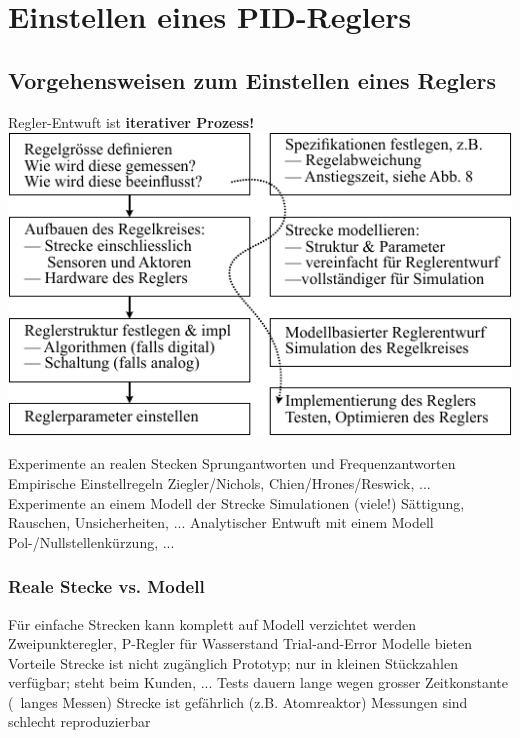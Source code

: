 
\section{Einstellen eines PID-Reglers} 

\subsection{Vorgehensweisen zum Einstellen eines Reglers}

\begin{minipage}[c]{0.43\columnwidth}
    Regler-Entwuft ist \textbf{iterativer Prozess!}
    \includegraphics[width=\columnwidth]{images/reglerentwurf_moegliche_schritte.pdf}
\end{minipage}
\hfill
\begin{minipage}[c]{0.56\columnwidth}
    \begin{outline}
        \1 Experimente an realen Stecken
            \2 Sprungantworten und Frequenzantworten
        \1 Empirische Einstellregeln
            \2 Ziegler/Nichols, Chien/Hrones/Reswick, ...
        \1 Experimente an einem Modell der Strecke
            \2 Simulationen (viele!)
            \2 Sättigung, Rauschen, Unsicherheiten, ...
        \1 Analytischer Entwuft mit einem Modell
            \2 Pol-/Nullstellenkürzung, ...
    \end{outline}
\end{minipage}


\subsubsection{Reale Stecke vs. Modell}

\begin{outline}
    \1 Für einfache Strecken kann komplett auf Modell verzichtet werden
        \2 Zweipunkteregler, P-Regler für Wasserstand
        \2 Trial-and-Error
    \1 Modelle bieten Vorteile
        \2 Strecke ist nicht zugänglich
            \3 Prototyp; nur in kleinen Stückzahlen verfügbar; steht beim Kunden, ...
        \2 Tests dauern lange wegen grosser Zeitkonstante (\textrightarrow\ langes Messen)
        \2 Strecke ist gefährlich (z.B. Atomreaktor)
        \2 Messungen sind schlecht reproduzierbar
\end{outline}


